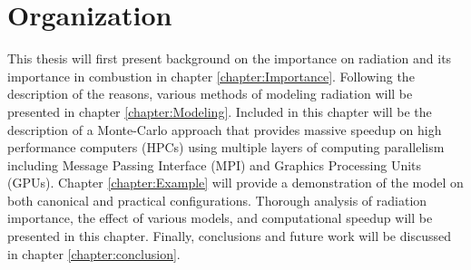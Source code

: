\section{Organization}
This thesis will first present background on the importance on radiation and its importance in combustion in chapter \ref{chapter:Importance}. 
Following the description of the reasons, various methods of modeling radiation will be presented in chapter \ref{chapter:Modeling}. Included in this chapter will be the description of a Monte-Carlo approach that provides massive speedup on high performance computers (HPCs) using multiple layers of computing parallelism including Message Passing Interface (MPI) and Graphics Processing Units (GPUs).
Chapter \ref{chapter:Example} will provide a demonstration of the model on both canonical and practical configurations. Thorough analysis of radiation importance, the effect of various models, and computational speedup will be presented in this chapter.
Finally, conclusions and future work will be discussed in chapter \ref{chapter:conclusion}.